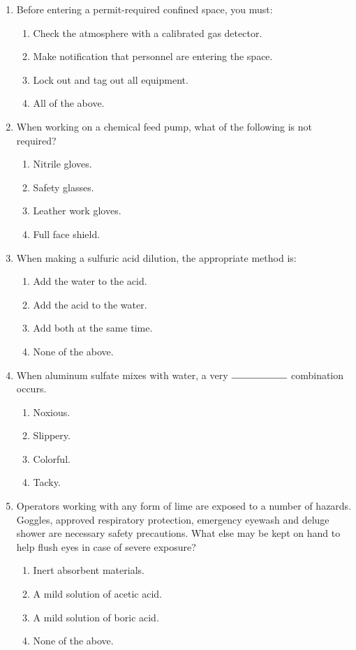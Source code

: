\begin{enumerate}
\item Before entering a permit-required confined space, you must:
\begin{enumerate}
\item Check the atmosphere with a calibrated gas detector.
\item Make notification that personnel are entering the space.
\item Lock out and tag out all equipment.
\item All of the above.
\end{enumerate}

\item When working on a chemical feed pump, what of the following is not required?
\begin{enumerate}
\item Nitrile gloves.
\item Safety glasses.
\item Leather work gloves.
\item Full face shield.
\end{enumerate}

\item When making a sulfuric acid dilution, the appropriate
method is:
\begin{enumerate}
\item Add the water to the acid.
\item Add the acid to the water.
\item Add both at the same time.
\item None of the above.
\end{enumerate}

\item When aluminum sulfate mixes with water, a very $\rule{2cm}{0.15mm}$ combination occurs.
\begin{enumerate}
\item Noxious.
\item Slippery.
\item Colorful.
\item Tacky.
\end{enumerate}

\item Operators working with any form of lime are exposed to a number of hazards. Goggles, approved respiratory protection, emergency eyewash and deluge shower are necessary safety precautions. What else may be kept on hand to help flush eyes in case of severe exposure?
\begin{enumerate}
\item Inert absorbent materials.
\item A mild solution of acetic acid.
\item A mild solution of boric acid.
\item None of the above.


\end{enumerate}
\end{enumerate}
